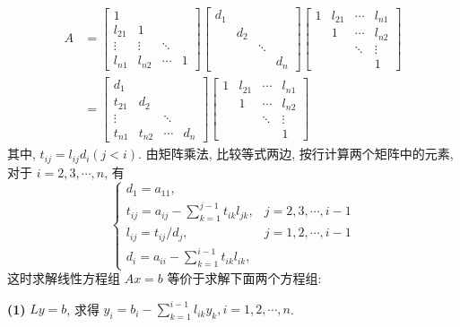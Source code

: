 $$
\begin{aligned}
A & =\left[\begin{array}{cccc}
1 & & & \\
l_{21} & 1 & & \\
\vdots & \vdots & \ddots & \\
l_{n 1} & l_{n 2} & \cdots & 1
\end{array}\right]\left[\begin{array}{llll}
d_{1} & & & \\
& d_{2} & & \\
& & \ddots & \\
& & & d_{n}
\end{array}\right]\left[\begin{array}{cccc}
1 & l_{21} & \cdots & l_{n 1} \\
& 1 & \cdots & l_{n 2} \\
& & \ddots & \vdots \\
& & & 1
\end{array}\right] \\
& =\left[\begin{array}{ccccc}
d_{1} & & & \\
t_{21} & d_{2} & & \\
\vdots & & \ddots & \\
t_{n 1} & t_{n 2} & \cdots & d_{n}
\end{array}\right]\left[\begin{array}{cccc}
1 & l_{21} & \cdots & l_{n 1} \\
& 1 & \cdots & l_{n 2} \\
& & \ddots & \vdots \\
& & & 1
\end{array}\right]
\end{aligned}
$$
其中, $ t_{i j}=l_{i j} d_{i}(j<i) $. 由矩阵乘法, 比较等式两边, 按行计算两个矩阵中的元素,对于 $ i=2,3, \cdots, n $, 有
$$
\left\{\begin{array}{ll}
d_{1}=a_{11}, & \\
t_{i j}=a_{i j}-\sum\limits_{k=1}^{j-1} t_{i k} l_{j k}, & j=2,3, \cdots, i-1 \\
l_{i j}=t_{i j} / d_{j}, & j=1,2, \cdots, i-1 \\
d_{i}=a_{i i}-\sum\limits_{k=1}^{i-1} t_{i k} l_{i k}, &
\end{array}\right.
$$
这时求解线性方程组 $ A x=b $ 等价于求解下面两个方程组:

\textbf{(1)} $ L y=b $, 求得 $ y_{i}=b_{i}-\sum\limits_{k=1}^{i-1} l_{i k} y_{k}, i=1,2, \cdots, n $.

